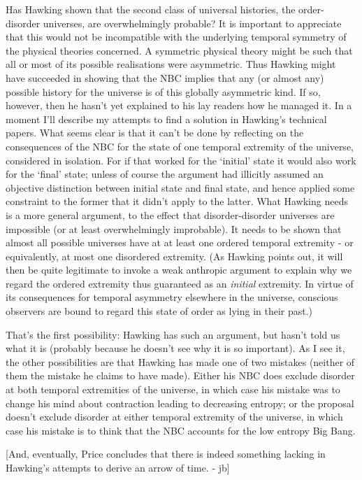 Has Hawking shown that the second class of universal histories, the
order-disorder universes, are overwhelmingly probable? It is important
to appreciate that this would not be incompatible with the underlying
temporal symmetry of the physical theories concerned. A symmetric
physical theory might be such that all or most of its possible
realisations were asymmetric. Thus Hawking might have succeeded in
showing that the NBC implies that any (or almost any) possible history
for the universe is of this globally asymmetric kind. If so, however,
then he hasn't yet explained to his lay readers how he managed it. In a
moment I'll describe my attempts to find a solution in Hawking's
technical papers. What seems clear is that it can't be done by
reflecting on the consequences of the NBC for the state of one temporal
extremity of the universe, considered in isolation. For if that worked
for the `initial' state it would also work for the `final' state; unless
of course the argument had illicitly assumed an objective distinction
between initial state and final state, and hence applied some constraint
to the former that it didn't apply to the latter. What Hawking needs is
a more general argument, to the effect that disorder-disorder universes
are impossible (or at least overwhelmingly improbable). It needs to be
shown that almost all possible universes have at at least one ordered
temporal extremity - or equivalently, at most one disordered extremity.
(As Hawking points out, it will then be quite legitimate to invoke a
weak anthropic argument to explain why we regard the ordered extremity
thus guaranteed as an \emph{initial} extremity. In virtue of its consequences
for temporal asymmetry elsewhere in the universe, conscious observers
are bound to regard this state of order as lying in their past.)
 
That's the first possibility: Hawking has such an argument, but hasn't
told us what it is (probably because he doesn't see why it is so
important).  As I see it, the other possibilities are that Hawking has
made one of two mistakes (neither of them the mistake he claims to have
made). Either his NBC does exclude disorder at both temporal extremities
of the universe, in which case his mistake was to change his mind about
contraction leading to decreasing entropy; or the proposal doesn't
exclude disorder at either temporal extremity of the universe, in which
case his mistake is to think that the NBC accounts for the low entropy
Big Bang.

[And, eventually, Price concludes that there is indeed something lacking
in Hawking's attempts to derive an arrow of time. - jb]


